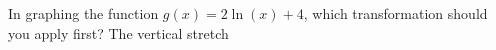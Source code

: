 {In graphing the function $g(x)=2 \ln{(x)} + 4$, which transformation should you apply first?}
{The vertical stretch}
